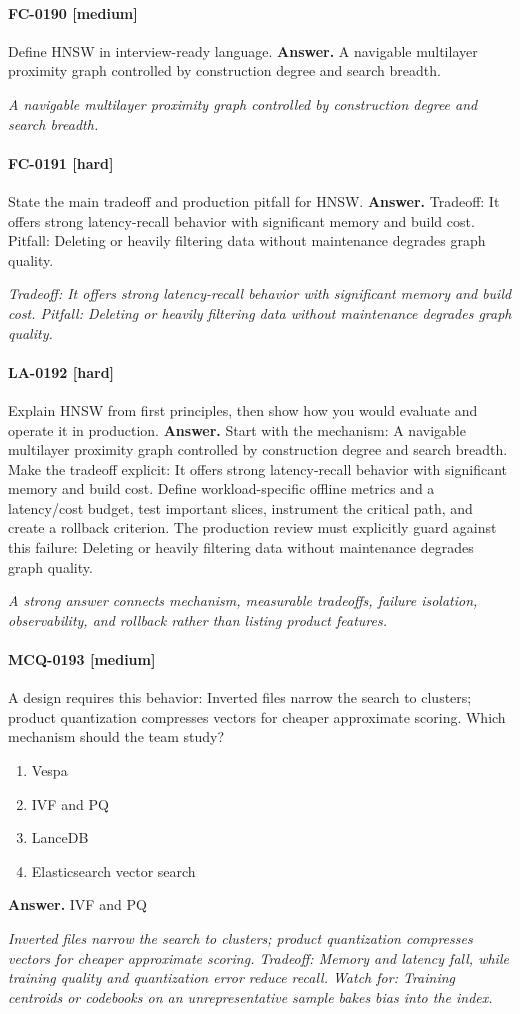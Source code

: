 \paragraph{FC-0190 [medium]} Define HNSW in interview-ready language.
\noindent\textbf{Answer.} A navigable multilayer proximity graph controlled by construction degree and search breadth.
\par\textit{A navigable multilayer proximity graph controlled by construction degree and search breadth.}
\paragraph{FC-0191 [hard]} State the main tradeoff and production pitfall for HNSW.
\noindent\textbf{Answer.} Tradeoff: It offers strong latency-recall behavior with significant memory and build cost. Pitfall: Deleting or heavily filtering data without maintenance degrades graph quality.
\par\textit{Tradeoff: It offers strong latency-recall behavior with significant memory and build cost. Pitfall: Deleting or heavily filtering data without maintenance degrades graph quality.}
\paragraph{LA-0192 [hard]} Explain HNSW from first principles, then show how you would evaluate and operate it in production.
\noindent\textbf{Answer.} Start with the mechanism: A navigable multilayer proximity graph controlled by construction degree and search breadth. Make the tradeoff explicit: It offers strong latency-recall behavior with significant memory and build cost. Define workload-specific offline metrics and a latency/cost budget, test important slices, instrument the critical path, and create a rollback criterion. The production review must explicitly guard against this failure: Deleting or heavily filtering data without maintenance degrades graph quality.
\par\textit{A strong answer connects mechanism, measurable tradeoffs, failure isolation, observability, and rollback rather than listing product features.}
\paragraph{MCQ-0193 [medium]} A design requires this behavior: Inverted files narrow the search to clusters; product quantization compresses vectors for cheaper approximate scoring. Which mechanism should the team study?
\begin{enumerate}[label=\Alph*.]
\item Vespa
\item IVF and PQ
\item LanceDB
\item Elasticsearch vector search
\end{enumerate}
\noindent\textbf{Answer.} IVF and PQ
\par\textit{Inverted files narrow the search to clusters; product quantization compresses vectors for cheaper approximate scoring. Tradeoff: Memory and latency fall, while training quality and quantization error reduce recall. Watch for: Training centroids or codebooks on an unrepresentative sample bakes bias into the index.}
